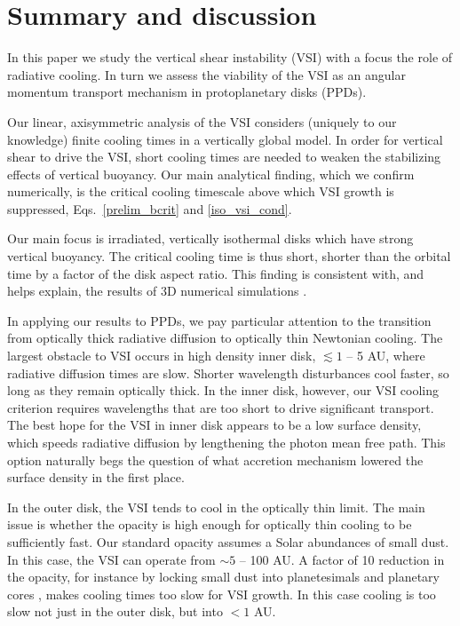 \section{Summary and discussion}\label{summary}
In this paper we study the vertical shear instability (VSI) with a focus the 
role of radiative cooling.  In turn we assess the viability of the VSI 
as an angular momentum transport mechanism in protoplanetary disks (PPDs).

Our linear, axisymmetric analysis of the VSI 
considers (uniquely to our knowledge) finite cooling times in a vertically global model.  
In order for vertical shear to drive the VSI, short cooling times are needed to weaken 
the stabilizing effects of vertical buoyancy. Our main analytical finding, which we confirm numerically, 
is the critical cooling  timescale above which VSI growth is suppressed, Eqs.\ \ref{prelim_bcrit} and \ref{iso_vsi_cond}.


Our main focus is irradiated, vertically isothermal disks which have strong vertical buoyancy.
The critical cooling time is thus short, shorter than the orbital time by a factor of the disk
aspect ratio.  This finding is consistent with, and helps explain, the results of 3D numerical simulations .

In applying our results to PPDs, we pay particular attention to the transition from 
optically thick radiative diffusion to optically thin Newtonian cooling.  The largest obstacle to VSI occurs in 
high density inner disk, $\lesssim 1$ -- 5 AU, where radiative diffusion times are slow.  Shorter wavelength disturbances
 cool faster, so long as they remain optically thick.  In the inner disk, however, our VSI cooling criterion requires 
 wavelengths that are too short to drive significant transport.  The best hope for the VSI in inner disk appears to 
 be a low surface density, which speeds radiative diffusion by lengthening the photon mean free path.  This option naturally begs 
 the question of what accretion mechanism lowered the surface density in the first place.
 
 In the outer disk, the VSI tends to cool in the optically thin limit.  The main issue is whether the opacity 
 is high enough for optically thin cooling to be sufficiently fast.  Our standard opacity assumes a Solar abundances of small dust.
 In this case, the VSI can operate from $\sim 5$ -- 100 AU.  A factor of 10 reduction in the opacity, for instance by locking
 small dust into planetesimals and planetary cores \citep{youdin13}, makes cooling times too slow for VSI growth.  
 In this case cooling is too slow not just in the outer disk, but into  $< 1$ AU.
 
